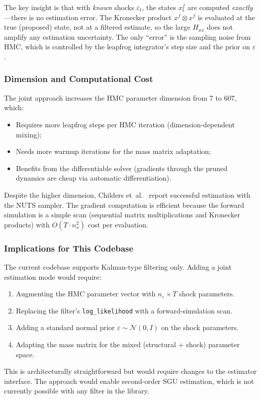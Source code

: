 \documentclass[11pt,a4paper]{article}
\theoremstyle{definition}
\begin{document}
	The key insight is that with \emph{known} shocks $\varepsilon_t$, the states $x^f_t$ are computed \emph{exactly}---there is no estimation error.
	The Kronecker product $x^f \otimes x^f$ is evaluated at the true (proposed) state, not at a filtered estimate, so the large $H_{xx}$ does not amplify any estimation uncertainty.
	The only ``error'' is the sampling noise from HMC, which is controlled by the leapfrog integrator's step size and the prior on $\varepsilon$.

	\subsubsection{Dimension and Computational Cost}

	The joint approach increases the HMC parameter dimension from 7 to 607, which:
	\begin{itemize}
		\item Requires more leapfrog steps per HMC iteration (dimension-dependent mixing);
		\item Needs more warmup iterations for the mass matrix adaptation;
		\item Benefits from the differentiable solver (gradients through the pruned dynamics are cheap via automatic differentiation).
	\end{itemize}

	Despite the higher dimension, Childers et~al.~\cite{childers2024} report successful estimation with the NUTS sampler.
	The gradient computation is efficient because the forward simulation is a simple scan (sequential matrix multiplications and Kronecker products) with $O(T \cdot n_x^2)$ cost per evaluation.

	\subsubsection{Implications for This Codebase}
	\label{sec:joint_impl}

	The current codebase supports Kalman-type filtering only.
	Adding a joint estimation mode would require:
	\begin{enumerate}
		\item Augmenting the HMC parameter vector with $n_\varepsilon \times T$ shock parameters.
		\item Replacing the filter's \texttt{log\_likelihood} with a forward-simulation scan.
		\item Adding a standard normal prior $\varepsilon \sim \mathcal{N}(0, I)$ on the shock parameters.
		\item Adapting the mass matrix for the mixed (structural + shock) parameter space.
	\end{enumerate}
	This is architecturally straightforward but would require changes to the estimator interface.
	The approach would enable second-order SGU estimation, which is not currently possible with any filter in the library.
\end{document}
